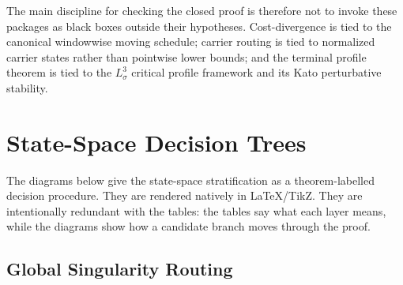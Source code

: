 \documentclass[11pt]{amsart}
\begin{document}
The main discipline for checking the closed proof is therefore not to invoke these packages as black boxes outside their hypotheses.  Cost-divergence is tied to the canonical windowwise moving schedule; carrier routing is tied to normalized carrier states rather than pointwise lower bounds; and the terminal profile theorem is tied to the \(L^3_\sigma\) critical profile framework and its Kato perturbative stability.

\section{State-Space Decision Trees}
\label{sec:state-space-trees}

The diagrams below give the state-space stratification as a theorem-labelled decision procedure. They are rendered natively in LaTeX/TikZ.  They are intentionally redundant with the tables: the tables say what each layer means, while the diagrams show how a candidate branch moves through the proof.

\subsection{Global Singularity Routing}
\end{document}
